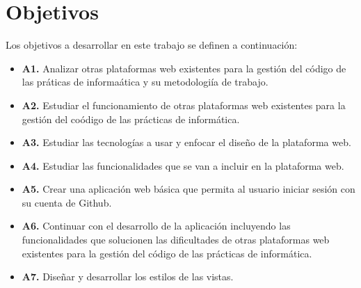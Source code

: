 
\section{Objetivos}
\label{2:sec:1}

Los objetivos a desarrollar en este trabajo se definen a continuación:

\begin{itemize}
  \item {\bf A1.} Analizar otras plataformas  web existentes para la gestión del código de las práticas de informaática y su metodologiía de trabajo.
  \item {\bf A2.} Estudiar el funcionamiento de otras plataformas  web existentes para la gestión del coódigo de las prácticas de informática.
  \item {\bf A3.} Estudiar las tecnologías a usar y enfocar el diseño de la plataforma web.
  \item {\bf A4.} Estudiar las funcionalidades que se van a incluir en la plataforma web.
  \item {\bf A5.} Crear una aplicación web básica que permita al usuario iniciar sesión con su cuenta de Github.
  \item {\bf A6.} Continuar con el desarrollo de la aplicación incluyendo las funcionalidades que solucionen las dificultades de otras plataformas  web existentes para la gestión del código de las prácticas de informática.
  \item {\bf A7.} Diseñar y desarrollar los estilos de las vistas.
\end{itemize}

